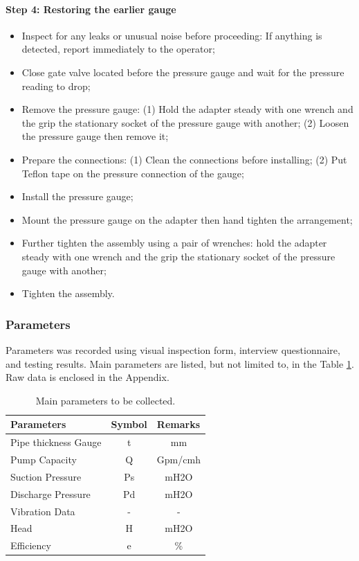 \paragraph{Step 4: Restoring the earlier gauge}
\begin{itemize}
\item Inspect for any leaks or unusual noise before proceeding: If anything is detected, report immediately to the operator;
\item 	Close gate valve located before the pressure gauge and wait for the pressure reading to drop;
\item Remove the pressure gauge: (1) Hold the adapter steady with one wrench and the grip the stationary socket of the pressure gauge with another; (2) Loosen the pressure gauge then remove it;
\item 	Prepare the connections: (1) Clean the connections before installing; (2) Put Teflon tape on the pressure connection of the gauge;
\item 	Install the pressure gauge;
\item 	Mount the pressure gauge on the adapter then hand tighten the arrangement;
\item 	Further tighten the assembly using a pair of wrenches: hold the adapter steady with one wrench and the grip the stationary socket of the pressure gauge with another;
\item 	Tighten the assembly.
\end{itemize}
\subsubsection{Parameters}
Parameters was recorded using visual inspection form, interview questionnaire, and testing results. Main parameters are listed, but not limited to, in the Table \ref{ch02_tbl_parameter}. Raw data is enclosed in the Appendix.

\begin{table}[h]
	\caption{Main parameters to be collected.}
	\label{ch02_tbl_parameter}
	{\footnotesize
\begin{tabular}{l|l|l}
	\hline
	Parameters & \multicolumn{1}{c|}{Symbol} & Remarks \\ 
	\hline
	Pipe thickness Gauge & \multicolumn{1}{c|}{t} & \multicolumn{1}{c}{mm} \\ 
	Pump Capacity & \multicolumn{1}{c|}{Q} & \multicolumn{1}{c}{Gpm/cmh} \\ 
	Suction Pressure  & \multicolumn{1}{c|}{Ps} & \multicolumn{1}{c}{mH2O} \\ 
	Discharge Pressure & \multicolumn{1}{c|}{Pd} & \multicolumn{1}{c}{mH2O} \\ 
	Vibration Data  & \multicolumn{1}{c|}{-} & \multicolumn{1}{c}{-} \\ 
	Head & \multicolumn{1}{c|}{H} & \multicolumn{1}{c}{mH2O} \\ 
	Efficiency  & \multicolumn{1}{c|}{e} & \multicolumn{1}{c}{\%} \\ 
		\hline
	\end{tabular}		
	}
\end{table}

